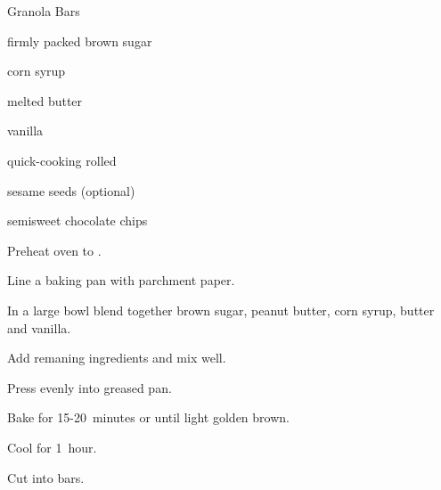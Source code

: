 \begin{recipe}{Granola Bars}{}{}

\begin{ingredients}
\item \C{\half} firmly packed brown sugar
\item \C{\twothird} 
\item \C{\half} corn syrup
\item \C{\half} melted butter
\item {} vanilla 
\item {} quick-cooking rolled 
\item \C{\half} 
\item {} sesame seeds (optional)
\item {} semisweet chocolate chips
\end{ingredients}

\begin{directions}
\item Preheat oven to . 
\item Line a  baking pan with parchment paper.
\item In a large bowl blend together brown sugar, peanut butter, corn syrup, butter and vanilla.
\item Add remaning ingredients and mix well.
\item Press evenly into greased pan.
\item Bake for 15-20~minutes or until light golden brown.
\item Cool for 1~hour. 
\item Cut into bars. 
\end{directions}

\end{recipe}
